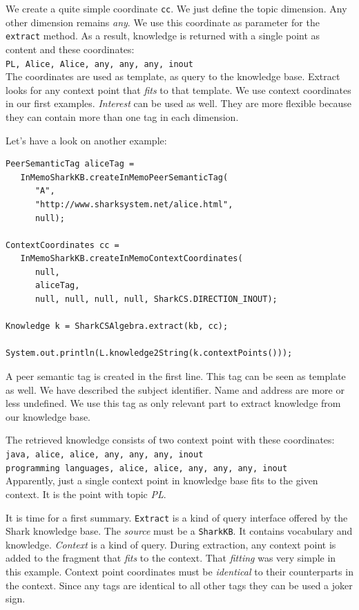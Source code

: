 We create a quite simple coordinate {\tt cc}. We just define the topic dimension. Any other dimension remains {\it any}. We use this coordinate as parameter for the {\tt extract} method. As a result, knowledge is returned with a single point as content and these coordinates:\\

{\tt PL, Alice, Alice, any, any, any, inout}\\

The coordinates are used as template, as query to the knowledge base. Extract looks for any context point that {\it fits} to that template. We use context coordinates in our first examples. {\it Interest} can be used as well. They are more flexible because they can contain more than one tag in each dimension.

Let's have a look on another example:

\begin{verbatim}
PeerSemanticTag aliceTag = 
   InMemoSharkKB.createInMemoPeerSemanticTag(
      "A", 
      "http://www.sharksystem.net/alice.html", 
      null);

ContextCoordinates cc = 
   InMemoSharkKB.createInMemoContextCoordinates(
      null, 
      aliceTag, 
      null, null, null, null, SharkCS.DIRECTION_INOUT);

Knowledge k = SharkCSAlgebra.extract(kb, cc);

System.out.println(L.knowledge2String(k.contextPoints()));

\end{verbatim}

A peer semantic tag is created in the first line. This tag can be seen as
template as well. We have described the subject identifier. Name and address are
more or less undefined. We use this tag as only relevant part to extract knowledge from our knowledge base.

The retrieved knowledge consists of two context point with these coordinates:\\

{\tt java, alice, alice, any, any, any, inout}\\

{\tt programming languages, alice, alice, any, any, any, inout}\\

Apparently, just a single context point in knowledge base fits to the given context. It is the point with topic {\it PL}.

It is time for a first summary. {\tt Extract} is a kind of query interface offered by the Shark knowledge base. The {\it source} must be a {\tt SharkKB}. It contains vocabulary and knowledge. {\it Context} is a kind of query. During extraction, any context point is added to the fragment that {\it fits} to the context. That {\it fitting} was very simple in this example. Context point coordinates must be {\it identical} to their counterparts in the context. Since any tags are identical to all other tags they can be used a joker sign.

